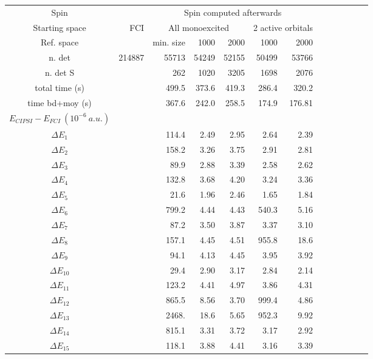 \documentclass[a4paper,10pt]{article}
\begin{document}
\begin{table*}[htbp]
  \begin{center}
 \begin{tabular}{|c|r|r|r|r|r|r|r|r|r|r|r|r|}
 \hline
Spin &  & \multicolumn{5}{|c|}{Spin computed afterwards} \\
Starting space & FCI  & \multicolumn{3}{|c|}{ All monoexcited } & \multicolumn{2}{|c|}{ 2 active orbitals } \\
Ref. space &  & min. size & 1000 & 2000 & 1000 & 2000 \\
 \hline
n. det          		&214887	&55713 	&54249 	&52155 	&50499 	&53766 \\
n. det S        	 	& 	&262 	& 1020 	& 3205 	& 1698 	& 2076 \\
total time (s)    	       	&	&499.5 	&373.6 	&419.3 	&286.4 	&320.2 \\
time bd+moy (s)    		& 	&367.6 	&242.0 	&258.5 	&174.9 	&176.81 \\
\hline
\hline
$E_{CIPSI} - E_{FCI} ~(10^{-6}~a.u.)$ & & & & & & \\
$\Delta E_1 $    		&	&114.4 	& 2.49 	& 2.95 	& 2.64 	& 2.39 \\
$\Delta E_2 $    		&	&158.2 	& 3.26 	& 3.75 	& 2.91 	& 2.81 \\
$\Delta E_3 $   	 	&	&89.9 	& 2.88 	& 3.39 	& 2.58 	& 2.62 \\
$\Delta E_4 $   	 	&	&132.8 	& 3.68 	& 4.20 	& 3.24 	& 3.36 \\
$\Delta E_5 $   	 	&	& 21.6 	& 1.96 	& 2.46 	& 1.65 	& 1.84 \\
$\Delta E_6 $   	 	&	&799.2 	& 4.44 	& 4.43 	&540.3 	& 5.16 \\
$\Delta E_7 $   	 	&	& 87.2 	& 3.50 	& 3.87 	& 3.37 	& 3.10 \\
$\Delta E_8$    		&	&157.1 	& 4.45 	& 4.51 	&955.8 	& 18.6 \\
$\Delta E_9 $  		  	&	&94.1 	& 4.13 	& 4.45 	& 3.95 	& 3.92 \\
$\Delta E_{10} $  	 	&	&29.4 	& 2.90 	& 3.17 	& 2.84 	& 2.14 \\
$\Delta E_{11} $ 	  	&	&123.2 	& 4.41 	& 4.97 	& 3.86 	& 4.31 \\
$\Delta E_{12} $  	 	&	&865.5 	& 8.56 	& 3.70 	&999.4 	& 4.86 \\
$\Delta E_{13} $ 	  	&	&2468. 	& 18.6 	& 5.65 	&952.3 	& 9.92 \\
$\Delta E_{14} $  	 	&	&815.1 	& 3.31 	& 3.72 	& 3.17 	& 2.92 \\
$\Delta E_{15} $  	 	&	&118.1 	& 3.88 	& 4.41 	& 3.16 	& 3.39 \\

\end{tabular}
\end{center}
\end{table*}
\end{document}
